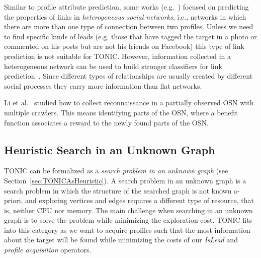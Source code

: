 \documentclass[journal]{IEEEtran}
\newcommand{\islead}[1]{{\em IsLead(#1)}}
\begin{document}
Similar to profile attribute prediction, some works (e.g.~\cite{tang2012inferring}) focused on predicting the properties of links in {\em heterogeneous social networks}, i.e., networks in which there are more than one type of connection between two profiles. 
Unless we need to find specific kinds of leads (e.g. those that have tagged the target in a photo or commented on his posts but are not his friends on Facebook) this type of link prediction is not suitable for TONIC.   
However, information collected in a heterogeneous network can be used to build stronger classifiers for link prediction~\cite{davis2011multi,dong2012link}. 
Since different types of relationships are usually created by different social processes they carry more information than flat networks. 


Li et al.~\cite{li2017adaptive} studied how to collect reconnaissance in a partially observed OSN with multiple crawlers. This means identifying parts of the OSN, where a benefit function associates a reward to the newly found parts of the OSN. 





\subsection{Heuristic Search in an Unknown Graph}
\label{sec:theWebAsAnUnknownGraph}
TONIC can be formalized  as a {\em search problem in an unknown graph} (see Section~\ref{sec:TONICAsHeuristic}). A search problem in an unknown graph is a search problem in which the structure of the searched graph is not known a-priori, and exploring vertices and edges requires a different type of resource, that is, neither CPU nor memory. The main challenge when searching in an unknown graph is to solve the problem while minimizing the exploration cost.
TONIC fits into this category  as we want to acquire profiles such that the most information about the target will be found while minimizing the costs of our {\em IsLead} and {\em profile acquisition} operators.
\end{document}
